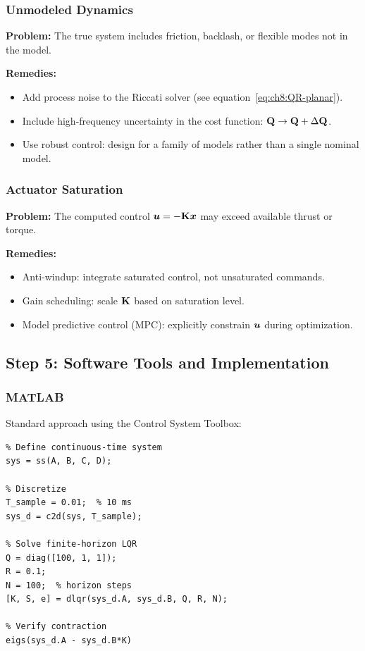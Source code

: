 \subsubsection{Unmodeled Dynamics}

\textbf{Problem:} The true system includes friction, backlash, or flexible modes not in the model.

\textbf{Remedies:}
\begin{itemize}
\item Add process noise to the Riccati solver (see equation~\eqref{eq:ch8:QR-planar}).
\item Include high-frequency uncertainty in the cost function: $\mathbf{Q} \to \mathbf{Q} + \Delta \mathbf{Q}$.
\item Use robust control: design for a family of models rather than a single nominal model.
\end{itemize}

\subsubsection{Actuator Saturation}

\textbf{Problem:} The computed control $\bm{u} = -\mathbf{K}\bm{x}$ may exceed available thrust or torque.

\textbf{Remedies:}
\begin{itemize}
\item Anti-windup: integrate saturated control, not unsaturated commands.
\item Gain scheduling: scale $\mathbf{K}$ based on saturation level.
\item Model predictive control (MPC): explicitly constrain $\bm{u}$ during optimization.
\end{itemize}

\subsection{Step 5: Software Tools and Implementation}

\subsubsection{MATLAB}

Standard approach using the Control System Toolbox:
\begin{verbatim}
% Define continuous-time system
sys = ss(A, B, C, D);

% Discretize
T_sample = 0.01;  % 10 ms
sys_d = c2d(sys, T_sample);

% Solve finite-horizon LQR
Q = diag([100, 1, 1]);
R = 0.1;
N = 100;  % horizon steps
[K, S, e] = dlqr(sys_d.A, sys_d.B, Q, R, N);

% Verify contraction
eigs(sys_d.A - sys_d.B*K)
\end{verbatim}

